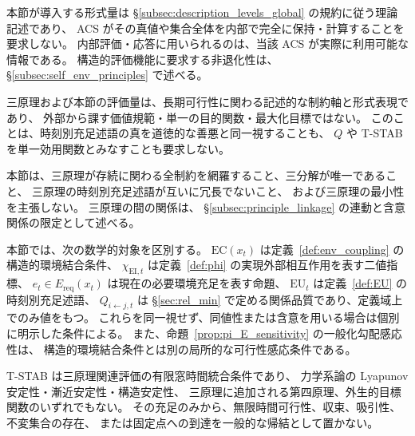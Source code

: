 \begin{remark}
\label{rem:conv_description_level}
本節が導入する形式量は \S\ref{subsec:description_levels_global} の規約に従う理論記述であり、
ACS がその真値や集合全体を内部で完全に保持・計算することを要求しない。
内部評価・応答に用いられるのは、当該 ACS が実際に利用可能な情報である。
構造的評価機能に要求する非退化性は、\S\ref{subsec:self_env_principles} で述べる。
\end{remark}

\begin{remark}[非規範性規約]
\label{rem:conv_nonnormative}
三原理および本節の評価量は、長期可行性に関わる記述的な制約軸と形式表現であり、
外部から課す価値規範・単一の目的関数・最大化目標ではない。
このことは、時刻別充足述語の真を道徳的な善悪と同一視することも、
$Q$ や T-STAB を単一効用関数とみなすことも要求しない。
\end{remark}

\begin{remark}
\label{rem:conv_nonexhaustive}
本節は、三原理が存続に関わる全制約を網羅すること、三分解が唯一であること、
三原理の時刻別充足述語が互いに冗長でないこと、
および三原理の最小性を主張しない。
三原理の間の関係は、
\S\ref{subsec:principle_linkage} の連動と含意関係の限定として述べる。
\end{remark}

\begin{remark}
\label{rem:conv_ro_layers}
本節では、次の数学的対象を区別する。
$\mathrm{EC}(x_t)$ は定義~\ref{def:env_coupling} の構造的環境結合条件、
$\chi_{\mathrm{EI},t}$ は定義~\ref{def:phi} の実現外部相互作用を表す二値指標、
$e_t\in E_{\mathrm{req}}(x_t)$ は現在の必要環境充足を表す命題、
$\mathrm{EU}_t$ は定義~\ref{def:EU} の時刻別充足述語、
$Q_{i\leftarrow j,t}$ は \S\ref{sec:rel_min} で定める関係品質であり、定義域上でのみ値をもつ。
これらを同一視せず、同値性または含意を用いる場合は個別に明示した条件による。
また、命題~\ref{prop:pi_E_sensitivity} の一般化勾配感応性は、
構造的環境結合条件とは別の局所的な可行性感応条件である。
\end{remark}

\begin{remark}
\label{rem:conv_tstab_scope}
T-STAB は三原理関連評価の有限窓時間統合条件であり、
力学系論の Lyapunov 安定性・漸近安定性・構造安定性、
三原理に追加される第四原理、外生的目標関数のいずれでもない。
その充足のみから、無限時間可行性、収束、吸引性、不変集合の存在、
または固定点への到達を一般的な帰結として置かない。
\end{remark}

